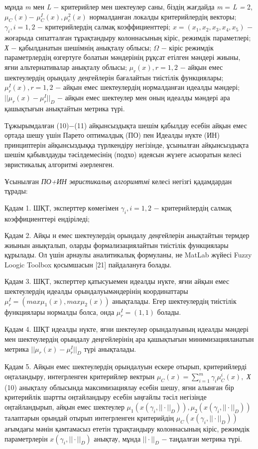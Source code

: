 \begin{multicols}{2}
мұнда \emph{m} мен \emph{L} − критерийлер мен шектеулер саны, біздің
жағдайда \emph{m} = \emph{L =} 2, $\mu_C(x)$−
$\mu^I_C(x),\mu_c^2(x)$ нормалданған локалды критерийлердің
векторы; $\gamma_i,i=1,2$ − критерийлердің салмақ
коэффициенттері; $x=(x_1,x_2,x_3,x_4,x_5)$ − жоғарыда
сипатталған тұрақтандыру колоннасының кіріс, режимдік параметлері;
\emph{Х} − қабылданатын шешімнің анықталу облысы;
$\Omega$ − кіріс режимдік параметрлердің
өзгертуге болатын мәндерінің рұқсат етілген мәндері жиыны, яғни
альтернативалар анықталу облысы; $\mu_r(x),r=1,2$ −
айқын емес шектеулердің орындалу деңгейлерін бағалайтын тиістілік
функциялары; $\mu_r^I(x),r=1,2$ − айқын емес
шектеулердің нормалданған идеалды мәндері;
$||\mu_r(x)-\mu_r^I||_D$ − айқын емес шектеулер мен оның
идеалды мәндері ара қашықтығын анықтайтын метрика түрі.

Тұжырымдалған (10)−(11) айқынсыздықта шешім қабылдау есебін айқын емес
ортада шешу үшін Парето оптималдық (ПО) пен Идеалды нүкте (ИН)
принциптерін айқынсыздыққа түрлкендіру негізінде, ұсынылған
айқынсыздықта шешім қабывлдауды тәсілдемесінің (подхо) идеясын жүзеге
асыоратын келесі эвристикалық алгоритмі әзерленген.

Ұсынылған \emph{ПО+ИН эвристикалық алгоримтмі} келесі негізгі
қадамдардан тұрады:

Қадам 1. ШҚТ, эксперттер көмегімен $\gamma_i,i=1,2$ − критерийлердің
салмақ коэффициенттері ендіріледі;

Қадам 2. Айқы н емес шектеулердің орындалу деңгейлерін анықтайтын
термдер жиынын анықталып, оларды формализациялайтын тиістілік
функциялары құрылады. Ол үшін арнаулы аналитикалық формуланы, не
MatLab жүйесі Fuzzy Loogic Toolbox қосымшасын {[}21{]} пайдалануға
болады.

Қадам 3. ШҚТ, эксперттер қатысуыемен идеалды нүкте, яғни айқын емес
шектеулердің идеалды орындалуымәндерінің координаттары
$\mu_r^I=(max\mu_1(x),max\mu_2(x))$ анықталады. Егер шектеулердің
тиістілік функциялары нормалды болса, онда $\mu_r^I=(1,1)$ болады.

Қадам 4. ШҚТ идеалды нүкте, яғни шектеулер орындалуының идеалды мәндері
мен шектеулердің орындалу деңгейлерінің ара қашықтығын
минимизацияланатын метрика $||\mu_r(x)-\mu_r^I||_D$ түрі
анықталады.

Қадам 5. Айқын емес шектеулердің орындалуын ескере отырып, критерийлерді
оңталандыру, интегрленген критерийлер вектрын
$\mu_C(x)=\sum_{i=1}^m\gamma_i\mu_C^i(x),$ \emph{Х} (10) анықталу облысында
максимизациялау есебін шешу, яғни алынған бір критерийлік шартты
оңтайландыру есебін ыңғайлы тәсіл негізінде оңтайландырып, айқын емес
шектеулер $\mu_1(x(\gamma_i,||\cdot||_D)),\mu_2(x(\gamma_i,||\cdot||_D))$ талаптарын орындай отырып
интегрленген критерийдің $\mu_C(x(\gamma_i,||\cdot||_D))$ ағымдағы
мәнін қамтамасыз ететін тұрақтандыру колоннасының кіріс, режимдік
параметрлерін $x(\gamma_i,||\cdot||_D)$ анықтау, мұнда
$||\cdot||_D$ − таңдалған метрика түрі.


\end{multicols}
